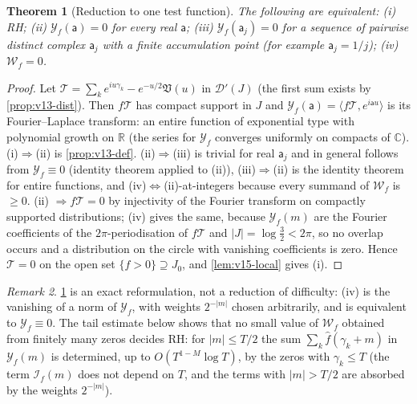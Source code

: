 \documentclass[11pt,a4paper]{article}
\numberwithin{equation}{section}
\newtheorem{theorem}{Theorem}[section]
\theoremstyle{definition}
\theoremstyle{remark}
\newtheorem{remark}[theorem]{Remark}
\begin{document}
\begin{theorem}[Reduction to one test function]\label{thm:v15-reduction}
The following are equivalent: (i) RH; (ii) $\mathscr Y_f(\mathsf a)=0$ for every real $\mathsf a$; (iii) $\mathscr Y_f(\mathsf a_j)=0$ for a sequence of pairwise distinct complex $\mathsf a_j$ with a finite accumulation point (for example $\mathsf a_j=1/j$); (iv) $\mathscr W_f=0$.
\end{theorem}
\begin{proof}
Let $\mathscr T=\sum_ke^{iu\gamma_k}-e^{-u/2}\mathfrak V(u)$ in $\mathcal D'(J)$ (the first sum exists by \cref{prop:v13-dist}). Then $f\mathscr T$ has compact support in $J$ and $\mathscr Y_f(\mathsf a)=\langle f\mathscr T,e^{i\mathsf au}\rangle$ is its Fourier--Laplace transform: an entire function of exponential type with polynomial growth on $\mathbb R$ (the series for $\mathscr Y_f$ converges uniformly on compacts of $\mathbb C$). (i)$\Rightarrow$(ii) is \cref{prop:v13-def}. (ii)$\Rightarrow$(iii) is trivial for real $\mathsf a_j$ and in general follows from $\mathscr Y_f\equiv0$ (identity theorem applied to (ii)), (iii)$\Rightarrow$(ii) is the identity theorem for entire functions, and (iv)$\iff$(ii)-at-integers because every summand of $\mathscr W_f$ is $\ge0$. (ii) $\Rightarrow f\mathscr T=0$ by injectivity of the Fourier transform on compactly supported distributions; (iv) gives the same, because $\mathscr Y_f(m)$ are the Fourier coefficients of the $2\pi$-periodisation of $f\mathscr T$ and $|J|=\log\frac32<2\pi$, so no overlap occurs and a distribution on the circle with vanishing coefficients is zero. Hence $\mathscr T=0$ on the open set $\{f>0\}\supseteq J_0$, and \cref{lem:v15-local} gives (i).
\end{proof}
\begin{remark}
\cref{thm:v15-reduction} is an exact reformulation, not a reduction of difficulty: (iv) is the vanishing of a norm of $\mathscr Y_f$, with weights $2^{-|m|}$ chosen arbitrarily, and is equivalent to $\mathscr Y_f\equiv0$. The tail estimate below shows that no small value of $\mathscr W_f$ obtained from finitely many zeros decides RH: for $|m|\le T/2$ the sum $\sum_k\hat f(\gamma_k+m)$ in $\mathscr Y_f(m)$ is determined, up to $O(T^{1-M}\log T)$, by the zeros with $\gamma_k\le T$ (the term $\mathscr I_f(m)$ does not depend on $T$, and the terms with $|m|>T/2$ are absorbed by the weights $2^{-|m|}$).
\end{remark}
\end{document}
